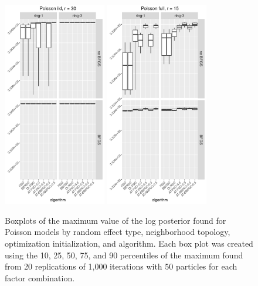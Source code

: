 \documentclass[12pt]{article}
\begin{document}
\begin{figure}[!ht]
\centering
\includegraphics[width=0.4\textwidth]{pop/maxplot12.png}
\includegraphics[width=0.4\textwidth]{pop/maxplot14.png}
\caption{Boxplots of the maximum value of the log posterior found for Poisson models by random effect type, neighborhood topology, optimization initialization, and algorithm. Each box plot was created using the 10, 25, 50, 75, and 90 percentiles of the maximum found from 20 replications of 1,000 iterations with 50 particles for each factor combination.}
\label{fig:popmaxboxplot}
\end{figure}
\end{document}
